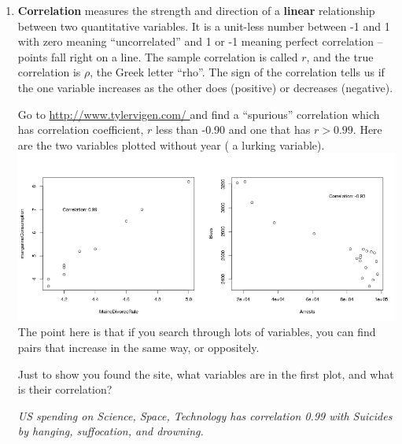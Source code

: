\begin{enumerate}
\begin{enumerate}
\begin{key}
  {\it 235}
\end{key} 
Any other line will have larger SSE.
\end{enumerate}

  \subsection{ Correlation}

  \item {\bf Correlation} measures the strength and direction of a {\bf
  linear} relationship between two quantitative variables. It is a
unit-less number between -1 and 1 with zero meaning ``uncorrelated'' and
1 or -1 meaning perfect correlation -- points fall right on a
line. The sample correlation is called $r$, and the true correlation
is $\rho$, the Greek letter ``rho''. 
 The sign  of the correlation tells us if the one variable
 increases as the other does (positive) or decreases (negative).

   Go to  \url{http://www.tylervigen.com/ } and find a
    ``spurious'' correlation which has correlation coefficient, $r$ less
    than -0.90 and one that has $r > 0.99$.  Here are the two
    variables plotted without year ( a lurking variable).\\
\includegraphics[width=\linewidth]{../plots/spuriousCorr.png}
    The point here is that if you search through lots of variables,
    you can find pairs that increase in the same way, or oppositely.

    Just to show you found the site, what variables are in the first
    plot, and what is their correlation?
\begin{students}
 \vspace{1cm}      
\end{students}

\begin{key}
  {\it  US spending on Science, Space, Technology has correlation 0.99
  with Suicides by hanging, suffocation, and drowning.}
\end{key}


\end{enumerate}
